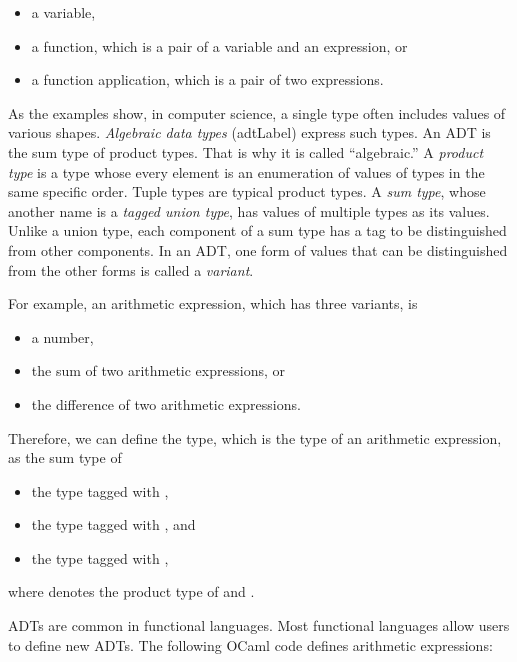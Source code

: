 \begin{itemize}
\item a variable,
\item a function, which is a pair of a variable and an expression, or
\item a function application, which is a pair of two expressions.
\end{itemize}

As the examples show, in computer science, a single type often includes values of
various shapes. \textit{Algebraic data types}
(\acrshort{adtLabel}) express such types. An ADT
is the sum type of product types. That is why it is called ``algebraic.''
A \textit{product type}
is a type whose every element is an enumeration of values of types in the
same specific order. Tuple types are typical product types. A \textit{sum
type}, whose
another name is a \textit{tagged union type},
has values of multiple types as its values. Unlike a union type,
each component of a sum type has a
tag to be distinguished from other components.
In an ADT, one form of values that can be distinguished from the other forms is
called a \textit{variant}.

For example, an arithmetic expression, which has three variants, is

\begin{itemize}
\item a number,
\item the sum of two arithmetic expressions, or
\item the difference of two arithmetic expressions.
\end{itemize}

Therefore, we can define the  type, which is the type of an arithmetic
expression, as the sum type of

\begin{itemize}
\item the  type tagged with ,
\item the  type tagged with , and
\item the  type tagged with ,
\end{itemize}

where  denotes the product type of  and .

ADTs are common in functional languages. Most functional
languages allow users to define new ADTs. The following OCaml
code defines arithmetic expressions:

